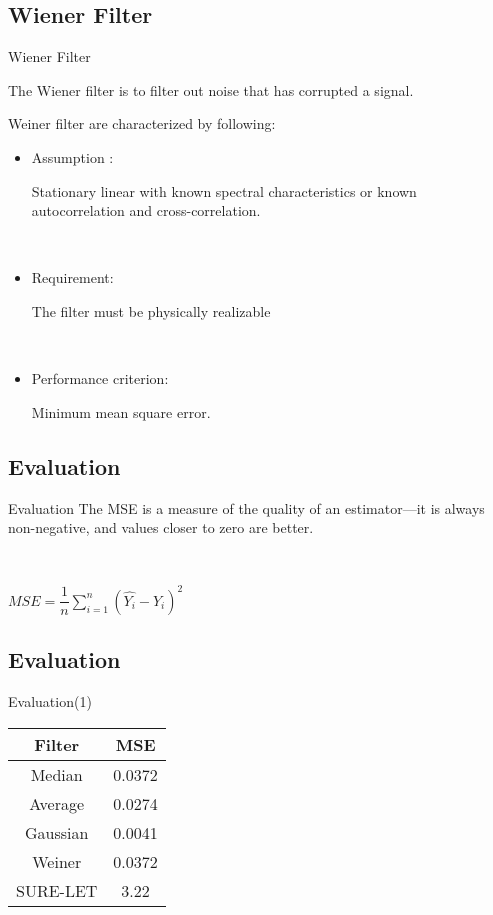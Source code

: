\documentclass{beamer}
\begin{document}
\subsection{Wiener Filter}
\begin{frame}{Wiener Filter}

The Wiener filter is to filter out noise that has corrupted a signal.
\vspace{1cm}

Weiner filter are characterized by following:
\begin{itemize}
	\item Assumption :
	
	Stationary linear with known spectral characteristics or
	known autocorrelation and cross-correlation.


\

	\item Requirement:
	
	The filter must be physically realizable

\

	\item Performance criterion: 
	
	Minimum mean square error.

\end{itemize} 
\end{frame}

\subsection{Evaluation}
\begin{frame}{Evaluation}
The MSE is a measure of the quality of an estimator—it is always non-negative, and values closer to zero are better.


\

\begin{center}

	$MSE =  \dfrac{1}{n} \displaystyle \sum_{i=1}^{n}(\hat{Y_i} - Y_i)^2$
	

\end{center}
 

\end{frame}


\subsection{Evaluation}
\begin{frame}{Evaluation(1)}
\begin{center}
	
\begin{tabular}{|c|c|}

	\hline 
	Filter & MSE \\ 
	\hline 
	Median & 0.0372 \\ 
	\hline 
	Average & 0.0274 \\ 
	\hline 
	Gaussian & 0.0041 \\ 
	\hline 
	Weiner & 0.0372 \\ 
	\hline 
	SURE-LET & 3.22 \\ 
	\hline 
\end{tabular} 
\end{center}
\end{frame}
\end{document}
